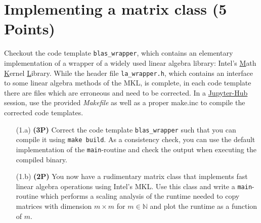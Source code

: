 \documentclass[a4paper, 12pt]{article}
\begin{document}
%
\section{Implementing a matrix class \textbf{(5 Points)}}
%
Checkout the code template \texttt{blas\_wrapper}, which contains an elementary implementation of a wrapper of a widely used linear algebra library: Intel's \underline{M}ath \underline{K}ernel \underline{L}ibrary.
%
While the header file \texttt{la\_wrapper.h}, which contains an interface to some linear algebra methods of the MKL, is complete, in each code template there are files which are erroneous and need to be corrected.
%
In a \href{https://jupyter.physik.uni-muenchen.de}{Jupyter-Hub} session, use the provided \textit{Makefile} as well as a proper make.inc to compile the corrected code templates.
%
\begin{itemize}
	\item[(1.a)] \textbf{(3P)}
	Correct the code template \texttt{blas\_wrapper} such that you can compile it using \texttt{make build}.
	As a consistency check, you can use the default implementation of the \texttt{main}-routine and check the output when executing the compiled binary.
	\item[(1.b)] \textbf{(2P)}
	You now have a rudimentary matrix class that implements fast linear algebra operations using Intel's MKL.
	Use this class and write a \texttt{main}-routine which performs a scaling analysis of the runtime needed to copy matrices with dimension $m \times m$ for $m\in\mathbb N$ and plot the runtime as a function of $m$.
\end{itemize}
%

%
\end{document}
